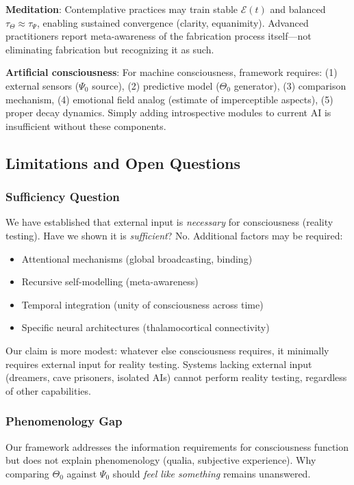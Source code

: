 \documentclass[11pt,a4paper]{article}
\begin{document}
\textbf{Meditation}: Contemplative practices may train stable $\mathcal{E}(t)$ and balanced $\tau_{\Theta} \approx \tau_{\Psi}$, enabling sustained convergence (clarity, equanimity). Advanced practitioners report meta-awareness of the fabrication process itself—not eliminating fabrication but recognizing it as such.

\textbf{Artificial consciousness}: For machine consciousness, framework requires: (1) external sensors ($\Psi_0$ source), (2) predictive model ($\Theta_0$ generator), (3) comparison mechanism, (4) emotional field analog (estimate of imperceptible aspects), (5) proper decay dynamics. Simply adding introspective modules to current AI is insufficient without these components.

\subsection{Limitations and Open Questions}

\subsubsection{Sufficiency Question}

We have established that external input is \textit{necessary} for consciousness (reality testing). Have we shown it is \textit{sufficient}? No. Additional factors may be required:
\begin{itemize}
\item Attentional mechanisms (global broadcasting, binding)
\item Recursive self-modelling (meta-awareness)
\item Temporal integration (unity of consciousness across time)
\item Specific neural architectures (thalamocortical connectivity)
\end{itemize}

Our claim is more modest: whatever else consciousness requires, it minimally requires external input for reality testing. Systems lacking external input (dreamers, cave prisoners, isolated AIs) cannot perform reality testing, regardless of other capabilities.

\subsubsection{Phenomenology Gap}

Our framework addresses the information requirements for consciousness function but does not explain phenomenology (qualia, subjective experience). Why comparing $\Theta_0$ against $\Psi_0$ should \textit{feel like something} remains unanswered.
\end{document}
